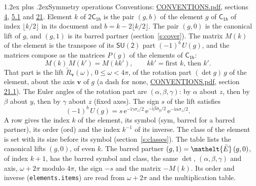 \documentclass[10pt,a4paper]{article}
\makeatletter
\renewcommand\section{\@startsection{section}{1}{\z@}{-3ex plus -1ex minus -.2ex}%
  {1.2ex plus .2ex}{\normalfont\large\sffamily\bfseries\color{parttitle}}}
\numberwithin{equation}{section}
\newcommand{\eltfont}[1]{{\let\sigma\eltsigma\mathelt{#1}}}
\newcommand{\grp}[1]{\mathsf{#1}}
\newcommand{\elt}[1]{\eltfont{#1}}
\newcommand{\vv}{\mathbf{v}}
\newcommand{\iunit}{\mathrm{i}}
\newcommand{\expe}{\mathrm{e}}
\newcommand{\barred}[1]{\bar{#1}}
\newcommand{\lift}[1]{\tilde{#1}}
\newcommand{\pauli}[1]{\sigma_{#1}}
\makeatother
\begin{document}
\section{Symmetry operations}\label{s:elements}
Conventions: \href{../../CONVENTIONS.pdf}{CONVENTIONS.pdf}, sections \href{../../../rotation/CONVENTIONS.pdf\#conv.4}{4}, \href{../../../rotation/CONVENTIONS.pdf\#conv.5.1}{5.1} and \href{../../CONVENTIONS.pdf\#conv.21}{21}.
\leavevmode\label{n:index.element}\label{n:element.g}Element $k$ of $\grp{2C_{1h}}$ is the pair $(g, b)$ of the element $g$ of \href{../../../rotation/data/pdf/C1h.pdf}{$\grp{C_{1h}}$} of index $\lfloor k/2\rfloor$ in its document and $b = k - 2\lfloor k/2\rfloor$. The pair $(g, 0)$ is the canonical lift of $g$, and $(g, 1)$ is its barred partner (section~\ref{s:cover}). \label{n:matrix.element.pin}\label{n:matrix.element}The matrix $M(k)$ of the element is the transpose of its $\grp{SU(2)}$ part $(-1)^{b}\,U(g)$, and the matrices compose as the matrices $P(g)$ of the elements of $\grp{C_{1h}}$:
\begin{equation}\label{e:mprod}M(k)\,M(k') = M(kk'),\qquad kk' = \text{first } k\text{, then } k'.\end{equation}
\leavevmode\label{n:angle.omega}\label{n:vector.axis}\label{n:vector.pole}That part is the lift $\lift{R}_{\vv}(\omega)$, $0 \le \omega < 4\pi$, of the rotation part $(\det g)\,g$ of the element, about the axis $\vv$ of $g$ (a dash for none, \href{../../CONVENTIONS.pdf}{CONVENTIONS.pdf}, section \href{../../CONVENTIONS.pdf\#conv.21.1}{21.1}). \label{n:angle.euler.alpha}\label{n:angle.euler.beta}\label{n:angle.euler.gamma}\label{n:vector.coordinates}The Euler angles of the rotation part are $(\alpha,\beta,\gamma)$: by $\alpha$ about $z$, then by $\beta$ about $y$, then by $\gamma$ about $z$ (fixed axes). \label{n:local.euler.sign}The sign $s$ of the lift satisfies
\begin{equation}\label{e:euler}(-1)^{b}\,U(g) = s\,\expe^{-\iunit\gamma\pauli{z}/2}\,\expe^{-\iunit\beta\pauli{y}/2}\,\expe^{-\iunit\alpha\pauli{z}/2}.\end{equation}
\leavevmode\label{n:index.element.inverse}\label{n:head.sym}\label{n:head.ord}A row gives the index $k$ of the element, its symbol (sym, barred for a barred partner), its order (ord) and the index $k^{-1}$ of its inverse. \label{n:head.class}The class of the element is set with its size before its symbol (section~\ref{s:classes}).
The table lists the canonical lifts $(g, 0)$, of even $k$. The barred partner $(g, 1) = \elt{\barred{E}}\,(g, 0)$, of index $k + 1$, has the barred symbol and class, the same $\det$, $(\alpha,\beta,\gamma)$ and axis, $\omega + 2\pi$ modulo $4\pi$, the sign $-s$ and the matrix $-M(k)$. Its order and inverse (\texttt{elements.items}) are read from $\omega + 2\pi$ and the multiplication table.
\end{document}
